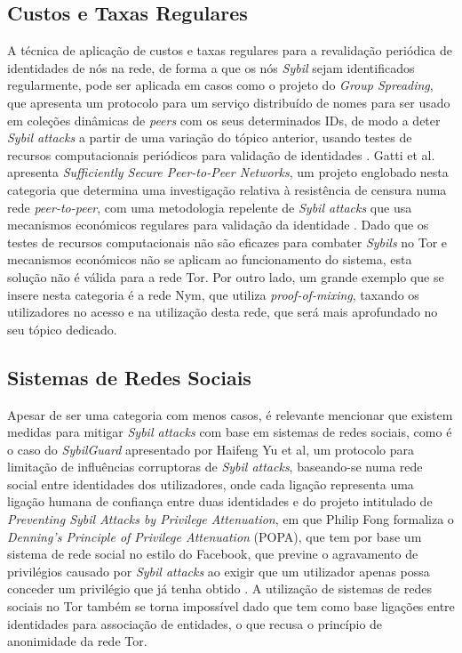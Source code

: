 \subsection{Custos e Taxas Regulares}
\label{ssec:custos_taxas_regulares}

A técnica de aplicação de custos e taxas regulares para a revalidação periódica de identidades de nós na rede, de forma a que os nós \textit{Sybil} sejam identificados regularmente, pode ser aplicada em casos como o projeto do \textit{Group Spreading}, que apresenta um protocolo para um serviço distribuído de nomes para ser usado em coleções dinâmicas de \textit{peers} com os seus determinados IDs, de modo a deter \textit{Sybil attacks} a partir de uma variação do tópico anterior, usando testes de recursos computacionais periódicos para validação de identidades \cite{awerbuch2004group}. Gatti et al. apresenta \textit{Sufficiently Secure Peer-to-Peer Networks}, um projeto englobado nesta categoria que determina uma investigação relativa à resistência de censura numa rede \textit{peer-to-peer}, com uma metodologia repelente de \textit{Sybil attacks} que usa mecanismos económicos regulares para validação da identidade \cite{article}. Dado que os testes de recursos computacionais não são eficazes para combater \textit{Sybils} no Tor e mecanismos económicos não se aplicam ao funcionamento do sistema, esta solução não é válida para a rede Tor. Por outro lado, um grande exemplo que se insere nesta categoria é a rede Nym, que utiliza \textit{proof-of-mixing}, taxando os utilizadores no acesso e na utilização desta rede, que será mais aprofundado no seu tópico dedicado.

\subsection{Sistemas de Redes Sociais}
\label{ssec:sistemas_redes_sociais}

Apesar de ser uma categoria com menos casos, é relevante mencionar que existem medidas para mitigar \textit{Sybil attacks} com base em sistemas de redes sociais, como é o caso do \textit{SybilGuard} apresentado por Haifeng Yu et al, um protocolo para limitação de influências corruptoras de \textit{Sybil attacks}, baseando-se numa rede social entre identidades dos utilizadores, onde cada ligação representa uma ligação humana de confiança entre duas identidades \cite{10.1145/1151659.1159945} e do projeto intitulado de \textit{Preventing Sybil Attacks by Privilege Attenuation}, em que Philip Fong formaliza o \textit{Denning's Principle of Privilege Attenuation} (POPA), que tem por base um sistema de rede social no estilo do Facebook, que previne o agravamento de privilégios causado por \textit{Sybil attacks} ao exigir que um utilizador apenas possa conceder um privilégio que já tenha obtido \cite{5958034}. A utilização de sistemas de redes sociais no Tor também se torna impossível dado que tem como base ligações entre identidades para associação de entidades, o que recusa o princípio de anonimidade da rede Tor.

